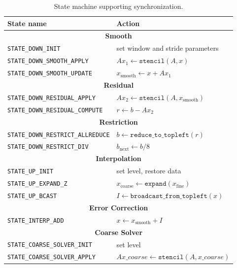 \documentclass[sigconf]{acmart}
\begin{document}
        \noindent
        \begin{table}[h] \caption{State machine supporting synchronization.} \label{tab:state_machine}
        \begin{small}
        \begin{tabular}{|l||p{1.35in}|} \hline 
        \textbf{State name} & \textbf{Action}\\ \hline \hline
        \multicolumn{2}{|c|}{\textbf{Smooth}}\\ \hline \hline
        \texttt{STATE\_DOWN\_INIT} & set window and stride parameters\\ \hline
        \texttt{STATE\_DOWN\_SMOOTH\_APPLY} & $Ax_1 \gets \texttt{stencil}(A, x)$\\ \hline
        \texttt{STATE\_DOWN\_SMOOTH\_UPDATE} & $x_{\mathrm{smooth}} \gets x + Ax_1$\\ \hline \hline
        \multicolumn{2}{|c|}{\textbf{Residual}}\\ \hline \hline
        \texttt{STATE\_DOWN\_RESIDUAL\_APPLY} & $Ax_2 \gets \texttt{stencil}(A, x_{\mathrm{smooth}})$\\ \hline
        \texttt{STATE\_DOWN\_RESIDUAL\_COMPUTE} & $r \gets b - Ax_2$\\ \hline
        \multicolumn{2}{|c|}{\textbf{Restriction}}\\ \hline \hline    
        \texttt{STATE\_DOWN\_RESTRICT\_ALLREDUCE} & $b \gets \texttt{reduce\_to\_topleft}(r)$\\ \hline
        \texttt{STATE\_DOWN\_RESTRICT\_DIV} & $b_{\mathrm{next}} \gets b/8$\\ \hline \hline
        \multicolumn{2}{|c|}{\textbf{Interpolation}}\\ \hline \hline
        \texttt{STATE\_UP\_INIT} & set level, restore data \\ \hline
        \texttt{STATE\_UP\_EXPAND\_Z} & $x_{\mathrm{coarse}} \gets \texttt{expand}(x_{\mathrm{fine}})$\\ \hline
        \texttt{STATE\_UP\_BCAST} & $I \gets \texttt{broadcast\_from\_topleft}(x)$\\ \hline \hline
        \multicolumn{2}{|c|}{\textbf{Error Correction}}\\ \hline \hline
        \texttt{STATE\_INTERP\_ADD} & $x \gets x_{\mathrm{smooth}} + I$\\ \hline
        \multicolumn{2}{|c|}{\textbf{Coarse Solver}}\\ \hline \hline
        \texttt{STATE\_COARSE\_SOLVER\_INIT} & set level \\ \hline
        \texttt{STATE\_COARSE\_SOLVER\_APPLY} & $Ax\_coarse \gets \texttt{stencil}(A, x\_coarse)$\\ \hline
        
        
        \end{tabular}
        \end{small}
        \end{table}     
\end{document}
